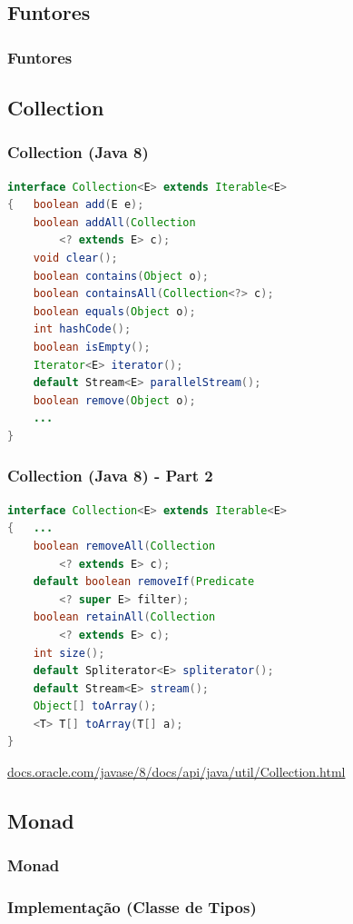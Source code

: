 \documentclass{beamer}
\begin{document}
\subsection{Funtores}
\begin{frame}
    \frametitle{Funtores}
\end{frame}

\subsection{Collection}
\begin{frame}[fragile]
    \frametitle{Collection (Java 8)}
    \begin{lstlisting}[language=Java]
interface Collection<E> extends Iterable<E>
{   boolean add(E e);
    boolean addAll(Collection
        <? extends E> c);
    void clear();
    boolean contains(Object o);
    boolean containsAll(Collection<?> c);
    boolean equals(Object o);
    int hashCode();
    boolean isEmpty();
    Iterator<E> iterator();
    default Stream<E> parallelStream();
    boolean remove(Object o);
    ...
}
    \end{lstlisting}
\end{frame}

\begin{frame}[fragile]
    \frametitle{Collection (Java 8) - Part 2}
    \begin{lstlisting}[language=Java]
interface Collection<E> extends Iterable<E>
{   ...
    boolean removeAll(Collection
        <? extends E> c);
    default boolean removeIf(Predicate
        <? super E> filter);
    boolean retainAll(Collection
        <? extends E> c);
    int size();
    default Spliterator<E> spliterator();
    default Stream<E> stream();
    Object[] toArray();
    <T> T[] toArray(T[] a);
}
    \end{lstlisting}
    \vfill
    \url{docs.oracle.com/javase/8/docs/api/java/util/Collection.html}
\end{frame}

\subsection{Monad}
\begin{frame}
    \frametitle{Monad}
\end{frame}

\begin{frame}
    \frametitle{Implementação (Classe de Tipos)}
\end{frame}
\end{document}
